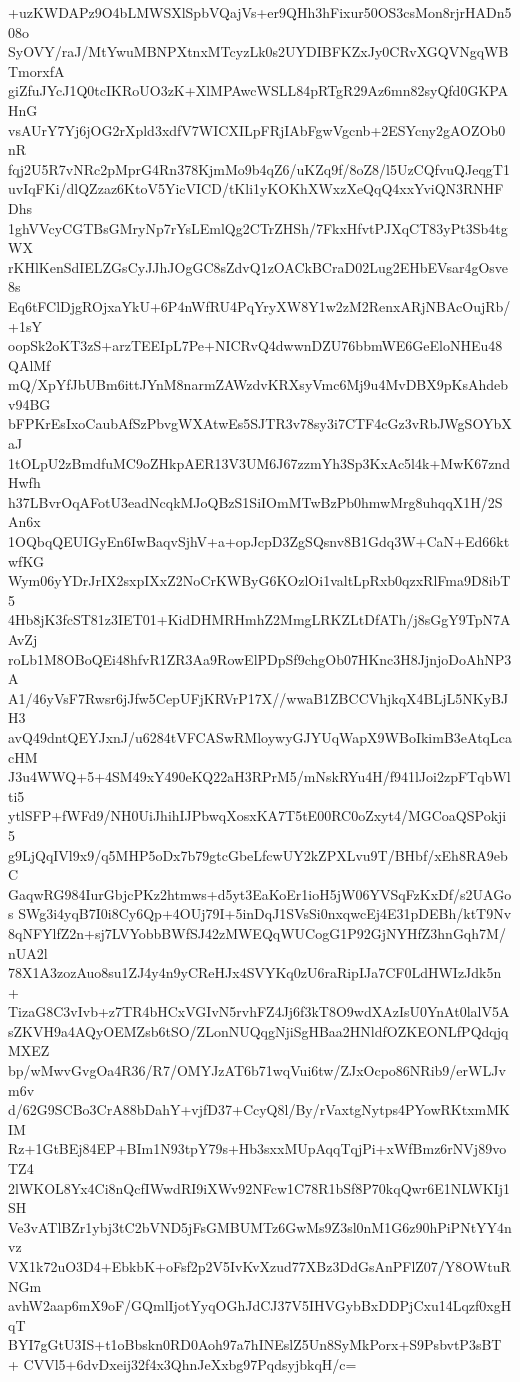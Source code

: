 +uzKWDAPz9O4bLMWSXlSpbVQajVs+er9QHh3hFixur50OS3csMon8rjrHADn508o
SyOVY/raJ/MtYwuMBNPXtnxMTcyzLk0s2UYDIBFKZxJy0CRvXGQVNgqWBTmorxfA
giZfuJYcJ1Q0tcIKRoUO3zK+XlMPAwcWSLL84pRTgR29Az6mn82syQfd0GKPAHnG
vsAUrY7Yj6jOG2rXpld3xdfV7WICXILpFRjIAbFgwVgcnb+2ESYcny2gAOZOb0nR
fqj2U5R7vNRc2pMprG4Rn378KjmMo9b4qZ6/uKZq9f/8oZ8/l5UzCQfvuQJeqgT1
uvIqFKi/dlQZzaz6KtoV5YicVICD/tKli1yKOKhXWxzXeQqQ4xxYviQN3RNHFDhs
1ghVVcyCGTBsGMryNp7rYsLEmlQg2CTrZHSh/7FkxHfvtPJXqCT83yPt3Sb4tgWX
rKHlKenSdIELZGsCyJJhJOgGC8sZdvQ1zOACkBCraD02Lug2EHbEVsar4gOsve8s
Eq6tFClDjgROjxaYkU+6P4nWfRU4PqYryXW8Y1w2zM2RenxARjNBAcOujRb/+1sY
oopSk2oKT3zS+arzTEEIpL7Pe+NICRvQ4dwwnDZU76bbmWE6GeEloNHEu48QAlMf
mQ/XpYfJbUBm6ittJYnM8narmZAWzdvKRXsyVmc6Mj9u4MvDBX9pKsAhdebv94BG
bFPKrEsIxoCaubAfSzPbvgWXAtwEs5SJTR3v78sy3i7CTF4cGz3vRbJWgSOYbXaJ
1tOLpU2zBmdfuMC9oZHkpAER13V3UM6J67zzmYh3Sp3KxAc5l4k+MwK67zndHwfh
h37LBvrOqAFotU3eadNcqkMJoQBzS1SiIOmMTwBzPb0hmwMrg8uhqqX1H/2SAn6x
1OQbqQEUIGyEn6IwBaqvSjhV+a+opJcpD3ZgSQsnv8B1Gdq3W+CaN+Ed66ktwfKG
Wym06yYDrJrIX2sxpIXxZ2NoCrKWByG6KOzlOi1valtLpRxb0qzxRlFma9D8ibT5
4Hb8jK3fcST81z3IET01+KidDHMRHmhZ2MmgLRKZLtDfATh/j8sGgY9TpN7AAvZj
roLb1M8OBoQEi48hfvR1ZR3Aa9RowElPDpSf9chgOb07HKnc3H8JjnjoDoAhNP3A
A1/46yVsF7Rwsr6jJfw5CepUFjKRVrP17X//wwaB1ZBCCVhjkqX4BLjL5NKyBJH3
avQ49dntQEYJxnJ/u6284tVFCASwRMloywyGJYUqWapX9WBoIkimB3eAtqLcacHM
J3u4WWQ+5+4SM49xY490eKQ22aH3RPrM5/mNskRYu4H/f941lJoi2zpFTqbWlti5
ytlSFP+fWFd9/NH0UiJhihIJPbwqXosxKA7T5tE00RC0oZxyt4/MGCoaQSPokji5
g9LjQqIVl9x9/q5MHP5oDx7b79gtcGbeLfcwUY2kZPXLvu9T/BHbf/xEh8RA9ebC
GaqwRG984IurGbjcPKz2htmws+d5yt3EaKoEr1ioH5jW06YVSqFzKxDf/s2UAGos
SWg3i4yqB7I0i8Cy6Qp+4OUj79I+5inDqJ1SVsSi0nxqwcEj4E31pDEBh/ktT9Nv
8qNFYlfZ2n+sj7LVYobbBWfSJ42zMWEQqWUCogG1P92GjNYHfZ3hnGqh7M/nUA2l
78X1A3zozAuo8su1ZJ4y4n9yCReHJx4SVYKq0zU6raRipIJa7CF0LdHWIzJdk5n+
TizaG8C3vIvb+z7TR4bHCxVGIvN5rvhFZ4Jj6f3kT8O9wdXAzIsU0YnAt0lalV5A
sZKVH9a4AQyOEMZsb6tSO/ZLonNUQqgNjiSgHBaa2HNldfOZKEONLfPQdqjqMXEZ
bp/wMwvGvgOa4R36/R7/OMYJzAT6b71wqVui6tw/ZJxOcpo86NRib9/erWLJvm6v
d/62G9SCBo3CrA88bDahY+vjfD37+CcyQ8l/By/rVaxtgNytps4PYowRKtxmMKIM
Rz+1GtBEj84EP+BIm1N93tpY79s+Hb3sxxMUpAqqTqjPi+xWfBmz6rNVj89voTZ4
2lWKOL8Yx4Ci8nQcfIWwdRI9iXWv92NFcw1C78R1bSf8P70kqQwr6E1NLWKIj1SH
Ve3vATlBZr1ybj3tC2bVND5jFsGMBUMTz6GwMs9Z3sl0nM1G6z90hPiPNtYY4nvz
VX1k72uO3D4+EbkbK+oFsf2p2V5IvKvXzud77XBz3DdGsAnPFlZ07/Y8OWtuRNGm
avhW2aap6mX9oF/GQmlIjotYyqOGhJdCJ37V5IHVGybBxDDPjCxu14Lqzf0xgHqT
BYI7gGtU3IS+t1oBbskn0RD0Aoh97a7hINEslZ5Un8SyMkPorx+S9PsbvtP3sBT+
CVVl5+6dvDxeij32f4x3QhnJeXxbg97PqdsyjbkqH/c=
